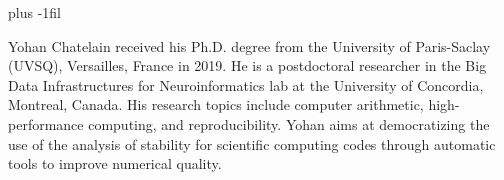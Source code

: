 \documentclass[10pt,journal,compsoc]{IEEEtran}
\begin{document}

%
%
%



% 

\baselineskip plus -1fil
\begin{IEEEbiography}{Yohan
        Chatelain} received his Ph.D. degree from the University of Paris-Saclay
    (UVSQ), Versailles, France in 2019. He is a postdoctoral researcher in the
    Big Data Infrastructures for Neuroinformatics lab at the University of
    Concordia, Montreal, Canada. His research topics include computer
    arithmetic, high-performance computing, and reproducibility. Yohan aims at
    democratizing the use of the analysis of stability for scientific computing
    codes through automatic tools to improve numerical quality. 
\end{IEEEbiography}
\end{document}
